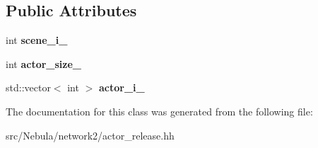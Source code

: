 \subsection*{Public Attributes}
\begin{DoxyCompactItemize}
\item 
\hypertarget{classneb_1_1packet_1_1actor__release_a93c67e65fd2391fa5788ea4df62dea83}{int {\bfseries scene\-\_\-i\-\_\-}}\label{classneb_1_1packet_1_1actor__release_a93c67e65fd2391fa5788ea4df62dea83}

\item 
\hypertarget{classneb_1_1packet_1_1actor__release_adb41a9a1ca585fc92c5811a086088fba}{int {\bfseries actor\-\_\-size\-\_\-}}\label{classneb_1_1packet_1_1actor__release_adb41a9a1ca585fc92c5811a086088fba}

\item 
\hypertarget{classneb_1_1packet_1_1actor__release_a38a61811df9631de91ded02972d2e23b}{std\-::vector$<$ int $>$ {\bfseries actor\-\_\-i\-\_\-}}\label{classneb_1_1packet_1_1actor__release_a38a61811df9631de91ded02972d2e23b}

\end{DoxyCompactItemize}


The documentation for this class was generated from the following file\-:\begin{DoxyCompactItemize}
\item 
src/\-Nebula/network2/actor\-\_\-release.\-hh\end{DoxyCompactItemize}
